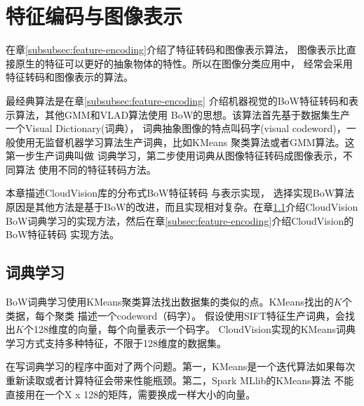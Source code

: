 \section{特征编码与图像表示}
\label{sec:image-representation}
在章\ref{subsubsec:feature-encoding}介绍了特征转码和图像表示算法，
图像表示比直接原生的特征可以更好的抽象物体的特性。所以在图像分类应用中，
经常会采用特征转码和图像表示的算法。

最经典算法是在章\ref{subsubsec:feature-encoding}
介绍机器视觉的BoW特征转码和表示算法，其他GMM和VLAD算法使用
BoW的思想。该算法首先基于数据集生产一个Visual Dictionary(词典），
词典抽象图像的特点叫码字(visual codeword)，一般使用无监督机器学习算法生产词典，比如KMeans
聚类算法或者GMM算法。这第一步生产词典叫做
词典学习，第二步使用词典从图像特征转码成图像表示，不同算法
使用不同的特征转码方法。

本章描述CloudVision库的分布式BoW特征转码
与表示实现，
选择实现BoW算法原因是其他方法是基于BoW的改进，而且实现相对复杂。在章\ref{subsec:dict-learning}介绍CloudVision
BoW词典学习的实现方法，然后在章\ref{subsec:feature-encoding}介绍CloudVision的BoW特征转码
实现方法。

\subsection{词典学习}
\label{subsec:dict-learning}
BoW词典学习使用KMeans聚类算法找出数据集的类似的点。KMeans找出的$K$个类据，每个聚类
描述一个codeword（码字）。
假设使用SIFT特征生产词典，会找出$K$个128维度的向量，每个向量表示一个码字。
CloudVision实现的KMeans词典学习方式支持多种特征，不限于128维度的数据集。

在写词典学习的程序中面对了两个问题。第一，KMeans是一个迭代算法如果每次
重新读取或者计算特征会带来性能瓶颈。第二，Spark MLlib的KMeans算法
不能直接用在一个X x 128的矩阵，需要换成一样大小的向量。


